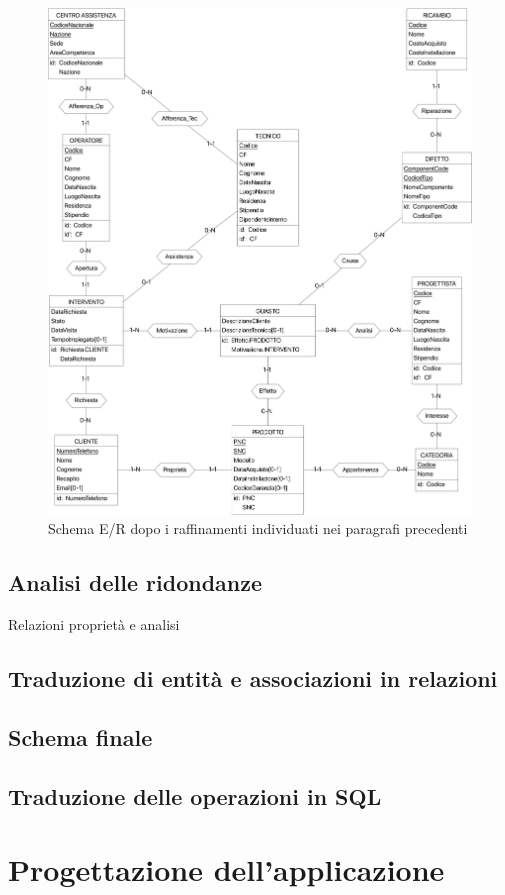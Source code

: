 \documentclass[a4paper, 12pt]{report}
\begin{document}
\begin{figure}[H]
	\centering
	\includegraphics[width=\linewidth]{images/Refined.png}
	\caption{Schema E/R dopo i raffinamenti individuati nei paragrafi precedenti}
\end{figure}

\section{Analisi delle ridondanze}

Relazioni proprietà e analisi

\section{Traduzione di entità e associazioni in relazioni}

\section{Schema finale}

\section{Traduzione delle operazioni in SQL}

\chapter{Progettazione dell'applicazione}
\end{document}
